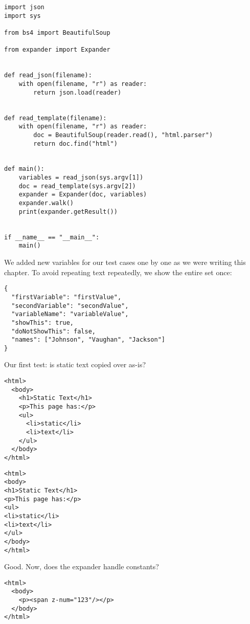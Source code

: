 \documentclass{scrbook}
\begin{document}
\begin{lstlisting}[frame=single,frameround=tttt]
import json
import sys

from bs4 import BeautifulSoup

from expander import Expander


def read_json(filename):
    with open(filename, "r") as reader:
        return json.load(reader)


def read_template(filename):
    with open(filename, "r") as reader:
        doc = BeautifulSoup(reader.read(), "html.parser")
        return doc.find("html")


def main():
    variables = read_json(sys.argv[1])
    doc = read_template(sys.argv[2])
    expander = Expander(doc, variables)
    expander.walk()
    print(expander.getResult())


if __name__ == "__main__":
    main()
\end{lstlisting}



We added new variables for our test cases one by one
as we were writing this chapter.
To avoid repeating text repeatedly,
we show the entire set once:


\begin{lstlisting}[frame=single,frameround=tttt]
{
  "firstVariable": "firstValue",
  "secondVariable": "secondValue",
  "variableName": "variableValue",
  "showThis": true,
  "doNotShowThis": false,
  "names": ["Johnson", "Vaughan", "Jackson"]
}
\end{lstlisting}



Our first test:
is static text copied over as-is?


\begin{lstlisting}[frame=single,frameround=tttt]
<html>
  <body>
    <h1>Static Text</h1>
    <p>This page has:</p>
    <ul>
      <li>static</li>
      <li>text</li>
    </ul>
  </body>
</html>
\end{lstlisting}



\begin{lstlisting}[frame=single,frameround=tttt]
<html>
<body>
<h1>Static Text</h1>
<p>This page has:</p>
<ul>
<li>static</li>
<li>text</li>
</ul>
</body>
</html>
\end{lstlisting}



Good.
Now, does the expander handle constants?


\begin{lstlisting}[frame=single,frameround=tttt]
<html>
  <body>
    <p><span z-num="123"/></p>
  </body>
</html>
\end{lstlisting}
\end{document}
